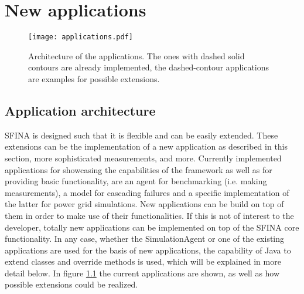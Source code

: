 \documentclass[11pt,fleqn]{book} %
\begin{document}


\chapter{New applications}

\begin{figure}[!ht]
\centering\texttt{[image: applications.pdf]}
\caption{Architecture of the applications. The ones with dashed solid contours are already implemented, the dashed-contour applications are examples for possible extensions.}
\label{fig:apps}
\end{figure}

\section{Application architecture}\label{sec:apps}
SFINA is designed such that it is flexible and can be easily extended. These extensions can be the implementation of a new application as described in this section, more sophisticated measurements, and more. Currently implemented applications for showcasing the capabilities of the framework as well as for providing basic functionality, are an agent for benchmarking (i.e. making measurements), a model for cascading failures and a specific implementation of the latter for power grid simulations. New applications can be build on top of them in order to make use of their functionalities. If this is not of interest to the developer, totally new applications can be implemented on top of the SFINA core functionality. In any case, whether the SimulationAgent or one of the existing applications are used for the basis of new applications, the capability of Java to extend classes and override methods is used, which will be explained in more detail below. In figure \ref{fig:apps} the current applications are shown, as well as how possible extensions could be realized.
\end{document}
